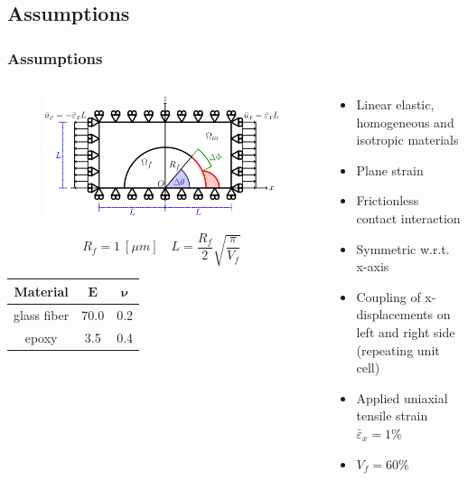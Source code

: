 \documentclass[first,firstsupp,lastsupp,last,hyperref,table]{ETHclass}
\begin{document}
\subsection{Assumptions}

\begin{frame}
\frametitle{\small Assumptions}
\vspace{-1.cm}
\centering
\begin{columns}
\begin{column}{0.6\textwidth}
\begin{figure}
\includegraphics[width=0.95\columnwidth]{RUC.pdf}
\end{figure}
\vspace{-0.1cm}
\scriptsize
\begin{equation*}
R_{f}=1\ \left[\mu m\right]\quad L=\frac{R_{f}}{2}\sqrt{\frac{\pi}{V_{f}}}
\end{equation*}
\vspace{-0.25cm}
\begin{table}[htbp]
\scriptsize
  \centering
    \begin{tabular}{ccc}
    \toprule
    \textbf{Material} & $\mathbf{E}$ &$\mathbf{\nu}$ \\
    \midrule
    glass fiber    & 70.0  & 0.2\\
    epoxy    & 3.5    & 0.4\\
    \bottomrule
    \end{tabular}
\end{table}
\end{column}
\begin{column}{0.4\textwidth}
\scriptsize
\begin{itemize}[label=]
\item Linear elastic, homogeneous and isotropic materials
\item Plane strain
\item Frictionless contact interaction
\item Symmetric w.r.t. x-axis
\item Coupling of x-displacements on left and right side (repeating unit cell)
\item Applied uniaxial tensile strain $\bar{\varepsilon}_{x}=1\%$
\item $V_{f}=60\%$
\end{itemize}
\end{column}
\end{columns}
\end{frame}
\end{document}
